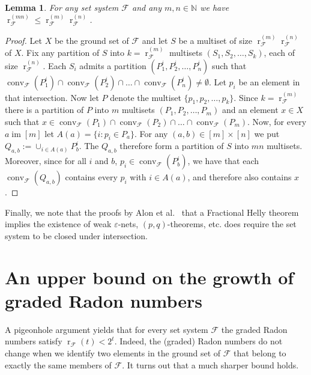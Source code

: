 \documentclass[a4paper,UKenglish,thm-restate]{article}
\newcommand{\N}{\mathbb{N}}
\newcommand{\F}{\mathcal{F}}
\DeclareMathOperator{\conv}{conv}
\DeclareMathOperator{\rad}{r}
\DeclareMathOperator{\im}{im}
\newtheorem{lemma}{Lemma}[section]
\begin{document}
\begin{lemma}
  For any set system $\F$ and any $m,n \in \N$ we have $\rad^{(mn)}_\F \le \rad^{(m)}_\F\rad^{(n)}_\F$.
\end{lemma}
\begin{proof}
  Let $X$ be the ground set of $\F$ and let $S$ be a multiset of size $\rad^{(m)}_\F\rad^{(n)}_\F$ of $X$. Fix any partition of $S$ into $k = \rad^{(m)}_\F$ multisets $(S_1, S_2, \ldots, S_k)$, each of size $\rad^{(n)}_\F$. Each $S_i$ admits a partition $(P^i_1, P^i_2, \ldots, P^i_n)$ such that $\conv_{\F}(P^i_1) \cap \conv_{\F}(P^i_2) \cap \ldots  \cap \conv_{\F}(P^i_n)\neq \emptyset$. Let $p_i$ be an element in that intersection. Now let $P$ denote the multiset $\{p_1, p_2, \ldots, p_k\}$. Since $k = \rad^{(m)}_\F$ there is a partition of $P$ into $m$ multisets $(P_1,P_2, \ldots, P_m)$ and an element $x \in X$ such that $x \in \conv_{\F}(P_1) \cap \conv_{\F}(P_2) \cap \ldots  \cap \conv_{\F}(P_m)$. Now, for every $a \im [m]$ let $A(a) = \{i \colon p_i \in P_a\}$. For any $(a,b) \in [m]\times [n]$ we put $Q_{a,b} := \cup_{i \in A(a)} P^i_b$. The $Q_{a,b}$ therefore form a partition of $S$ into $mn$ multisets. Moreover, since for all $i$ and $b$, $p_i\in \conv_{\F}(P_b^i)$, we have that each $\conv_\F(Q_{a,b})$ contains every $p_i$ with $i \in A(a)$, and therefore also contains $x$.
\end{proof}

\bigskip

Finally, we note that the proofs by Alon et al.~\cite{transversal-hypergraph} that a Fractional Helly theorem implies the existence of weak $\varepsilon$-nets, $(p,q)$-theorems, etc. does require the set system to be closed under intersection.


\section{An upper bound on the growth of graded Radon numbers}\label{app:rab}

A pigeonhole argument yields that for every set system $\F$ the graded Radon numbers satisfy $\rad_\F(t)< 2^t$. Indeed, the (graded) Radon numbers do not change when we identify two elements in the ground set of $\F$ that belong to exactly the same members of $\F$. It turns out that a much sharper bound holds.
\end{document}
